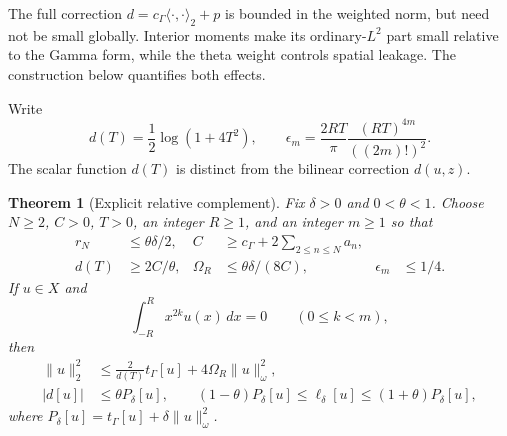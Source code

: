\documentclass[11pt,a4paper]{article}
\numberwithin{equation}{section}
\newtheorem{theorem}{Theorem}[section]
\theoremstyle{remark}
\newcommand{\tg}{t_{\Gamma}}
\newcommand{\cg}{c_{\Gamma}}
\newcommand{\ip}[2]{\langle #1,#2\rangle}
\newcommand{\norm}[1]{\lVert #1\rVert}
\begin{document}
The full correction $d=\cg\ip\cdot\cdot_2+p$ is bounded in the weighted norm, but need not be small globally. Interior moments make its ordinary-$L^2$ part small relative to the Gamma form, while the theta weight controls spatial leakage. The construction below quantifies both effects.

Write
\[
 d(T)=\frac12\log(1+4T^2),\qquad
 \epsilon_m=\frac{2RT}{\pi}\frac{(RT)^{4m}}{((2m)!)^2}.
\]
The scalar function $d(T)$ is distinct from the bilinear correction $d(u,z)$.

\begin{theorem}[Explicit relative complement]\label{thm:moment}
Fix $\delta>0$ and $0<\theta<1$. Choose $N\ge2$, $C>0$, $T>0$, an integer $R\ge1$, and an integer $m\ge1$ so that
\begin{align}
 r_N&\le\theta\delta/2,&
 C&\ge\cg+2\sum_{2\le n\le N}a_n,\label{eq:choices1}\\
 d(T)&\ge2C/\theta,&
 \Omega_R&\le\theta\delta/(8C),&
 \epsilon_m&\le1/4.\label{eq:choices2}
\end{align}
If $u\in X$ and
\begin{equation}\label{eq:moments}
 \int_{-R}^Rx^{2k}u(x)\,dx=0\qquad(0\le k<m),
\end{equation}
then
\begin{align}
 \norm u_2^2&\le\frac2{d(T)}\tg[u]+4\Omega_R\norm u_\omega^2,
                   \label{eq:Fouriermoment}\\
 |d[u]|&\le\theta P_\delta[u],\qquad
 (1-\theta)P_\delta[u]\le\ell_\delta[u]
                \le(1+\theta)P_\delta[u],\label{eq:relative}
\end{align}
where $P_\delta[u]=\tg[u]+\delta\norm u_\omega^2$.
\end{theorem}
\end{document}

